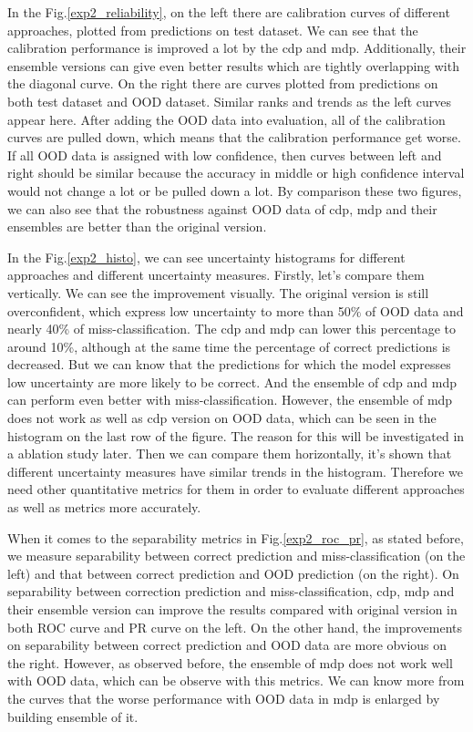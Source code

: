 In the Fig.\ref{exp2_reliability}, on the left there are calibration curves of different approaches, plotted from predictions on test dataset. We can see that the calibration performance is improved a lot by the cdp and mdp. Additionally, their ensemble versions can give even better results which are tightly overlapping with the diagonal curve. On the right there are curves plotted from predictions on both test dataset and OOD dataset. Similar ranks and trends as the left curves appear here. After adding the OOD data into evaluation, all of the calibration curves are pulled down, which means that the calibration performance get worse. If all OOD data is assigned with low confidence, then curves between left and right should be similar because the accuracy in middle or high confidence interval would not change a lot or be pulled down a lot. By comparison these two figures, we can also see that the robustness against OOD data of cdp, mdp and their ensembles are better than the original version.

In the Fig.\ref{exp2_histo}, we can see uncertainty histograms for different approaches and different uncertainty measures. Firstly, let's compare them vertically. We can see the improvement visually. The original version is still overconfident, which express low uncertainty to more than 50$\%$ of OOD data and nearly 40\% of miss-classification. The  cdp and mdp can lower this percentage to around 10\%, although at the same time the percentage of correct predictions is decreased. But we can know that the predictions for which the model expresses low uncertainty are more likely to be correct. And the ensemble of cdp and mdp can perform even better with miss-classification. However, the ensemble of mdp does not work as well as cdp version on OOD data, which can be seen in the histogram on the last row of the figure. The reason for this will be investigated in a ablation study later. Then we can compare them horizontally, it's shown that different uncertainty measures have similar trends in the histogram. Therefore we need other quantitative metrics for them in order to evaluate different approaches as well as metrics more accurately.  


When it comes to the separability metrics in Fig.\ref{exp2_roc_pr}, as stated before, we measure separability between correct prediction and miss-classification (on the left) and that between correct prediction and OOD prediction (on the right). On separability between correction prediction and miss-classification, cdp, mdp and their ensemble version can improve the results compared with original version in both ROC curve and PR curve on the left. On the other hand, the improvements on separability between correct prediction and OOD data are more obvious on the right. However, as observed before, the ensemble of mdp does not work well with OOD data, which can be observe with this metrics. We can know more from the curves that the worse performance with OOD data in mdp is enlarged by building ensemble of it.    

